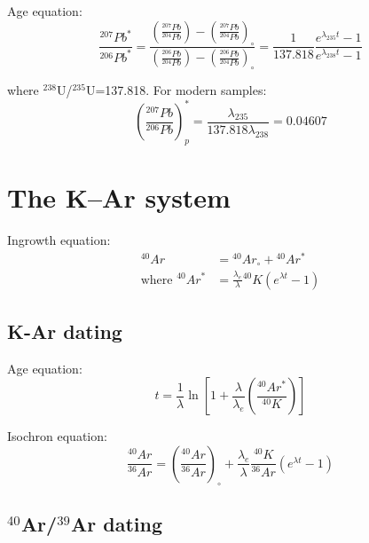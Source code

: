 \documentclass{article}
\begin{document}
\begin{multicols}{3}
Age equation:
\begin{equation}
\frac{^{207}Pb^*}{^{206}Pb^*} = 
\frac{\left(\frac{^{207}Pb}{^{204}Pb}\right)-\left(\frac{^{207}Pb}{^{204}Pb}\right)_\circ}
{\left(\frac{^{206}Pb}{^{204}Pb}\right)-\left(\frac{^{206}Pb}{^{204}Pb}\right)_\circ}
= \frac{1}{137.818} \frac{e^{\lambda_{235}t}-1}{e^{\lambda_{238}t}-1}
\label{eq:PbPb}
\end{equation}

where $^{238}$U/$^{235}$U=137.818. For modern samples:
\begin{equation}
  \left(\frac{^{207}Pb}{^{206}Pb}\right)^*_p =
  \frac{\lambda_{235}}{137.818\lambda_{238}} = 0.04607
\label{eq:commonPb}
\end{equation}

\section{The K--Ar system}
\label{sec:K-Ar}

Ingrowth equation:
\begin{equation}
\begin{array}{rl}
^{40}Ar & = {}^{40}Ar_\circ + {}^{40}Ar^*\\ 
\mbox{where~} {}^{40}Ar^* & =
  \frac{\lambda_e}{\lambda} {}^{40}K \left( e^{\lambda t} - 1 \right)
\end{array}
\label{eq:Ar}
\end{equation}

\subsection{K-Ar dating}

Age equation:
\begin{equation}
t = \frac{1}{\lambda} \ln\left[ 1 + \frac{\lambda}{\lambda_e}
  \left(\frac{^{40}Ar^*}{^{40}K}\right) \right]
\label{eq:K-Ar}
\end{equation}

Isochron equation:
\begin{equation}
\frac{^{40}Ar}{^{36}Ar} = \left(\frac{^{40}Ar}{^{36}Ar}\right)_\circ +
\frac{\lambda_e}{\lambda} \frac{^{40}K}{^{36}Ar} \left( e^{\lambda t} - 1 \right)
\label{eq:K-Ar-isochron}
\end{equation}

\subsection{$^{40}$Ar/$^{39}$Ar dating}
\label{sec:Ar-Ar}


\end{multicols}
\end{document}

